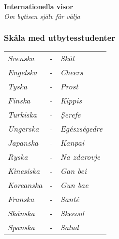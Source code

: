 \begin{center}
    \vspace*{1.5cm}
    {\fontsize{20}{20}\textbf{Internationella visor}}\\
    \vspace{0.7cm}
    {\fontsize{12}{12}\textit{Om bytisen själv får välja}}
\end{center}
\noBackground

\newpage
\resetBackground

\subsubsection*{Skåla med utbytesstudenter}

\begin{tabular}{l l l}
    \textit{Svenska} & - & \hspace{10pt} \textit{Skål} \\
    \textit{Engelska} & - & \hspace{10pt} \textit{Cheers} \\
    \textit{Tyska} & - & \hspace{10pt} \textit{Prost} \\
    \textit{Finska} & - & \hspace{10pt} \textit{Kippis} \\
    \textit{Turkiska} & - & \hspace{10pt} \textit{Şerefe} \\
    \textit{Ungerska} & - & \hspace{10pt} \textit{Egészségedre} \\
    \textit{Japanska} & - & \hspace{10pt} \textit{Kanpai} \\
    \textit{Ryska} & - & \hspace{10pt} \textit{Na zdarovje} \\
    \textit{Kinesiska} & - & \hspace{10pt} \textit{Gan bei} \\
    \textit{Koreanska} & - & \hspace{10pt} \textit{Gun bae} \\
    \textit{Franska} & - & \hspace{10pt} \textit{Santé} \\
    \textit{Skånska} & - & \hspace{10pt} \textit{Skeeool} \\
    \textit{Spanska} & - & \hspace{10pt} \textit{Salud} \\

\end{tabular}
